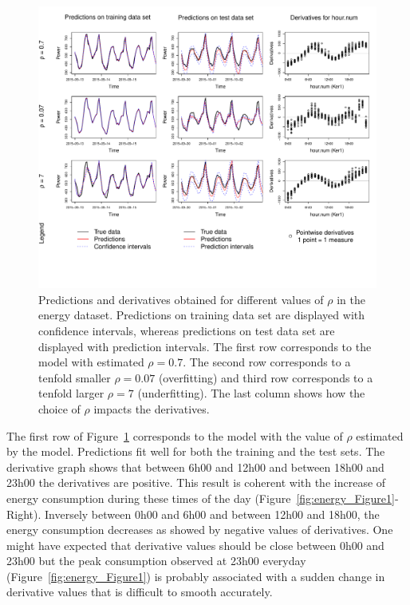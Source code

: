 \begin{figure}[htbp]
\centering
\includegraphics[width=\textwidth,  trim = 0cm 3cm 0cm 0cm, clip]{figure5}
\caption{\label{fig:energy_Figure2} Predictions and derivatives obtained for different values of $\rho$ in the energy dataset. Predictions on training data set are displayed with confidence intervals, whereas predictions on test data set are displayed with prediction intervals. The first row corresponds to the model  with estimated $\rho=0.7$. The second row corresponds to a tenfold smaller $\rho=0.07$ (overfitting) and third row corresponds to a tenfold larger $\rho=7$ (underfitting). The last column shows how the choice of $\rho$ impacts the derivatives.}
\end{figure}


The first row of Figure~\ref{fig:energy_Figure2} corresponds to the model with the value of $\rho$ estimated by the model. Predictions fit well for both the training and the test sets. The derivative graph shows that between 6h00 and 12h00 and between 18h00 and 23h00 the derivatives are positive. This result is coherent with the increase of energy consumption during these times of the day (Figure~\ref{fig:energy_Figure1}-Right). Inversely between 0h00 and 6h00 and between 12h00 and 18h00, the energy consumption decreases as showed by negative values of derivatives. One might have expected that derivative values should be close between 0h00 and 23h00 but the peak consumption observed at 23h00 everyday (Figure~\ref{fig:energy_Figure1}) is probably associated with a sudden change in derivative values that is difficult to smooth accurately.



